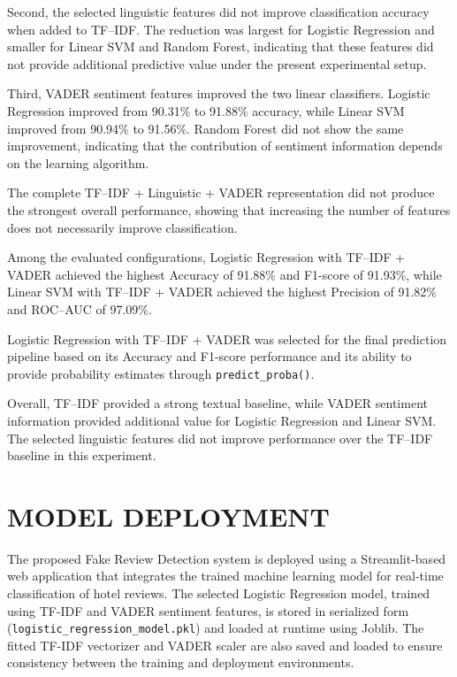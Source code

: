 \documentclass[12pt,a4paper]{report}
\begin{document}
Second, the selected linguistic features did not improve
classification accuracy when added to TF--IDF. The reduction was
largest for Logistic Regression and smaller for Linear SVM and Random
Forest, indicating that these features did not provide additional
predictive value under the present experimental setup.

Third, VADER sentiment features improved the two linear classifiers.
Logistic Regression improved from 90.31\% to 91.88\% accuracy, while
Linear SVM improved from 90.94\% to 91.56\%. Random Forest did not
show the same improvement, indicating that the contribution of
sentiment information depends on the learning algorithm.

The complete TF--IDF + Linguistic + VADER representation did not
produce the strongest overall performance, showing that increasing
the number of features does not necessarily improve classification.

Among the evaluated configurations, Logistic Regression with
TF--IDF + VADER achieved the highest Accuracy of 91.88\% and F1-score
of 91.93\%, while Linear SVM with TF--IDF + VADER achieved the highest
Precision of 91.82\% and ROC--AUC of 97.09\%.

Logistic Regression with TF--IDF + VADER was selected for the final
prediction pipeline based on its Accuracy and F1-score performance and
its ability to provide probability estimates through
\texttt{predict\_proba()}.

Overall, TF--IDF provided a strong textual baseline, while VADER
sentiment information provided additional value for Logistic
Regression and Linear SVM. The selected linguistic features did not
improve performance over the TF--IDF baseline in this experiment.

\newpage

\chapter{MODEL DEPLOYMENT}

The proposed Fake Review Detection system is deployed using a
Streamlit-based web application that integrates the trained machine
learning model for real-time classification of hotel reviews.
The selected Logistic Regression model, trained using TF-IDF
and VADER sentiment features, is stored in serialized form
(\texttt{logistic\_regression\_model.pkl}) and loaded at runtime
using Joblib. The fitted TF-IDF vectorizer and VADER scaler
are also saved and loaded to ensure consistency between
the training and deployment environments.
\end{document}
